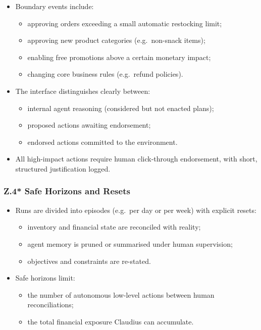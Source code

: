 \begin{itemize}
  \item Boundary events include:
        \begin{itemize}
          \item approving orders exceeding a small automatic restocking limit;
          \item approving new product categories (e.g.\ non-snack items);
          \item enabling free promotions above a certain monetary impact;
          \item changing core business rules (e.g.\ refund policies).
        \end{itemize}
  \item The interface distinguishes clearly between:
        \begin{itemize}
          \item internal agent reasoning (considered but not enacted plans);
          \item proposed actions awaiting endorsement;
          \item endorsed actions committed to the environment.
        \end{itemize}
  \item All high-impact actions require human click-through endorsement,
        with short, structured justification logged.
\end{itemize}

\subsubsection*{Z.4* Safe Horizons and Resets}

\begin{itemize}
  \item Runs are divided into episodes (e.g.\ per day or per week) with
        explicit resets:
        \begin{itemize}
          \item inventory and financial state are reconciled with reality;
          \item agent memory is pruned or summarised under human supervision;
          \item objectives and constraints are re-stated.
        \end{itemize}
  \item Safe horizons limit:
        \begin{itemize}
          \item the number of autonomous low-level actions between human
                reconciliations;
          \item the total financial exposure Claudius can accumulate.
        \end{itemize}
\end{itemize}


